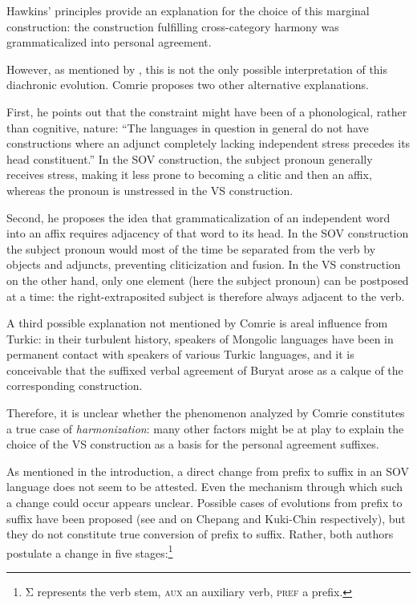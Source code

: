 \documentclass[oldfontcommands,twoside,a4paper,12pt]{article}
\newcommand{\grec}[1]{{\mleccha #1}}
\begin{document}
Hawkins' principles provide an explanation for the choice of this marginal construction: the construction fulfilling cross-category harmony  was grammaticalized into personal agreement.

 
However, as mentioned by \citet[92]{comrie80morpho}, this is not the only possible interpretation of this diachronic evolution. Comrie proposes two other alternative explanations.

First, he points out that the constraint might have been of a phonological, rather than cognitive, nature: ``The languages in question in general do not have constructions where an adjunct completely lacking independent stress precedes its head constituent.'' In the SOV construction, the subject pronoun generally receives stress, making it less prone to becoming a clitic and then an affix, whereas the pronoun is unstressed in the VS construction.

Second, he proposes the idea that grammaticalization of an independent word into an affix requires adjacency of that word to its head. In the SOV construction the subject pronoun would most of the time be separated from the verb by objects and adjuncts, preventing cliticization and fusion. In the VS construction on the other hand, only one element (here the subject pronoun) can be postposed at a time: the right-extraposited subject is therefore always adjacent to the verb.

A third possible explanation not mentioned by Comrie is areal influence from Turkic: in their turbulent history, speakers of Mongolic languages have been in permanent contact with speakers of various Turkic languages, and it is conceivable that the suffixed verbal agreement of Buryat arose as a calque of the corresponding construction.

Therefore, it is unclear whether the phenomenon analyzed by Comrie constitutes a true case of \textit{harmonization}: many other factors might be at play to explain the choice of the VS construction as a basis for the personal agreement suffixes.
 
As mentioned in the introduction, a direct change from prefix to suffix in an SOV language does not seem to be attested. Even the mechanism through which such a change could occur appears unclear. Possible cases of evolutions from prefix to suffix have been proposed (see \citealt{jacques12agreement} and \citealt{delancey11prefixes} on Chepang and Kuki-Chin respectively), but they do not constitute true conversion of prefix to suffix. Rather, both authors postulate a change in five stages:\footnote{\grec{Σ} represents the verb stem, \textsc{aux} an auxiliary verb, \textsc{pref} a prefix.}
 
\end{document}
